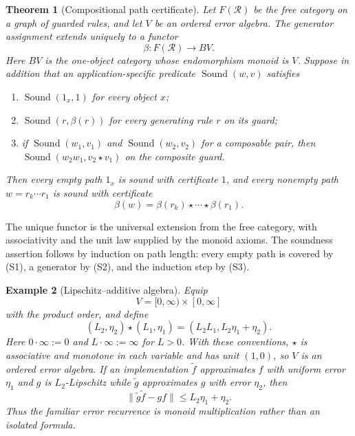 \documentclass[12pt,a4paper,twoside]{extarticle}
\makeatletter
\theoremstyle{compactplain}
\newtheorem{theorem}{Theorem}[section]
\theoremstyle{compactdef}
\newtheorem{example}[theorem]{Example}
\renewenvironment{proof}[1][\proofname]{\par\pushQED{\qed}\normalfont
  \topsep2pt\trivlist\item[\hskip\labelsep\bfseries #1\@addpunct{.}]\ignorespaces}
 {\popQED\endtrivlist\@endpefalse}
\makeatother
\begin{document}
\begin{theorem}[Compositional path certificate]\label{thm:ordered-path-certificate}
Let $F(\mathcal R)$ be the free category on a graph of guarded rules, and let $V$ be an ordered error algebra.  The generator assignment extends uniquely to a functor
\[
  \beta:F(\mathcal R)\longrightarrow BV.
\]
Here $BV$ is the one-object category whose endomorphism monoid is $V$.
Suppose in addition that an application-specific predicate $\operatorname{Sound}(w,v)$ satisfies
\begin{enumerate}[label=(S\arabic*)]
\item $\operatorname{Sound}(1_x,1)$ for every object $x$;
\item $\operatorname{Sound}(r,\beta(r))$ for every generating rule $r$ on its guard;
\item if $\operatorname{Sound}(w_1,v_1)$ and $\operatorname{Sound}(w_2,v_2)$ for a composable pair, then $\operatorname{Sound}(w_2w_1,v_2\star v_1)$ on the composite guard.
\end{enumerate}
Then every empty path $1_x$ is sound with certificate $1$, and every nonempty path $w=r_k\cdots r_1$ is sound with certificate
\[
 \beta(w)=\beta(r_k)\star\cdots\star\beta(r_1).
\]
\end{theorem}
\begin{proof}
The unique functor is the universal extension from the free category, with associativity and the unit law supplied by the monoid axioms.  The soundness assertion follows by induction on path length: every empty path is covered by (S1), a generator by (S2), and the induction step by (S3).
\end{proof}

\begin{example}[Lipschitz--additive algebra]
Equip
\[
  V=[0,\infty)\times[0,\infty]
\]
with the product order, and define
\[
  (L_2,\eta_2)\star(L_1,\eta_1)
  =(L_2L_1,L_2\eta_1+\eta_2).
\]
Here $0\cdot\infty:=0$ and $L\cdot\infty:=\infty$ for $L>0$.  With these conventions, $\star$ is associative and monotone in each variable and has unit $(1,0)$, so $V$ is an ordered error algebra.
If an implementation $\widetilde f$ approximates $f$ with uniform error $\eta_1$ and $g$ is $L_2$-Lipschitz while $\widetilde g$ approximates $g$ with error $\eta_2$, then
\[
 \|\widetilde g\widetilde f-gf\|\le L_2\eta_1+\eta_2.
\]
Thus the familiar error recurrence is monoid multiplication rather than an isolated formula.
\end{example}
\end{document}
